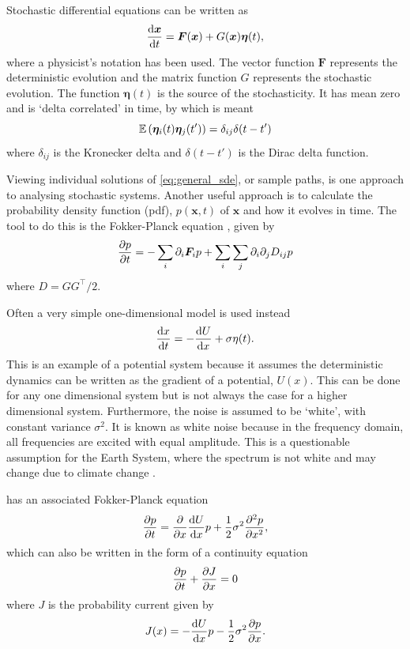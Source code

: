 Stochastic differential equations can be written \parencite{Jacobs2010} as
\begin{equation}
  \label{eq:general_sde}
  \dv{\bm{x}}{t} = \bm{F}(\bm{x}) + G(\bm{x})\bm{\eta}(t),
\end{equation}
where a physicist's notation has been used. The vector function $\bm{F}$ represents the deterministic evolution and the matrix function $G$ represents the stochastic evolution. The function
$\bm{\eta}(t)$ is the source of the stochasticity. It has mean zero and is `delta correlated' in time, by which is meant
\begin{equation}
  \label{eq:eta_correlation}
  \operatorname*{\mathbb{E}}\left(\bm{\eta}_i(t)\bm{\eta}_j(t')\right) = \delta_{ij}\delta(t-t')
\end{equation}
where $\delta_{ij}$ is the Kronecker delta and $\delta(t-t')$ is the Dirac delta function.

Viewing individual solutions of \cref{eq:general_sde}, or sample paths, is one approach  to analysing stochastic systems. Another useful approach is to calculate the probability density function
(pdf), $p(\bm{x},t)$ of $\bm{x}$ and how it evolves in time. The tool to do this is the Fokker-Planck equation \parencite{Fokker1914,Planck1917}, given by
\begin{equation}
  \label{eq:fokker_planck}
  \pdv{p}{t} = - \sum_i \partial_i \bm{F}_i p + \sum_i\sum_j \partial_i\partial_j D_{ij} p
\end{equation}
where $D = GG^\intercal/2$.

Often a very simple one-dimensional model is used instead
\begin{equation}
  \label{eq:simple_sde}
  \dv{x}{t} = -\dv{U}{x} + \sigma \eta(t).
\end{equation}
This is an example of a potential system because it assumes the deterministic dynamics can be written as the gradient of a potential, $U(x)$. This can be done for any one dimensional system but is not
always the case for a higher dimensional system. Furthermore, the noise is assumed to be `white', with constant variance $\sigma^2$. It is known as white noise because in the frequency domain, all
frequencies are excited with equal amplitude. This is a questionable assumption for the Earth System, where the spectrum is not white \parencite{Mitchell1976,VonderHeydt2021} and may
change due to climate change \parencite{Huntingford2013}.

 has an associated Fokker-Planck equation
\begin{equation}
  \label{eq:fokker_planck_one_d}
  \pdv{p}{t} = \pdv{x} \dv{U}{x}p + \frac{1}{2}\sigma^2 \pdv[2]{p}{x},
\end{equation}
which can also be written in the form of a continuity equation
\begin{equation}
  \label{eq:fokker_planck_continuity}
  \pdv{p}{t} + \pdv{J}{x} = 0
\end{equation}
where $J$ is the probability current given by
\begin{equation}
  \label{eq:probability_current}
  J(x) = -\dv{U}{x}p - \frac{1}{2}\sigma^2 \pdv{p}{x}.
\end{equation}

